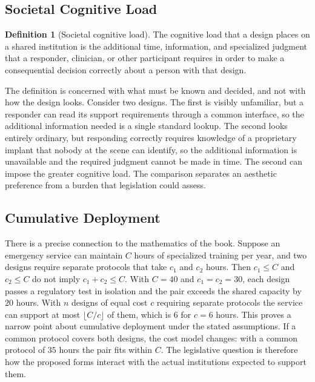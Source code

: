 \documentclass[11pt,openany]{book}
\theoremstyle{definition}
\newtheorem{definition}{Definition}[chapter]
\theoremstyle{remark}
\begin{document}
\subsection*{Societal Cognitive Load}

\begin{definition}[Societal cognitive load]
\label{def:load}
The cognitive load that a design places on a shared institution is the additional time, information, and specialized judgment that a responder, clinician, or other participant requires in order to make a consequential decision correctly about a person with that design.
\end{definition}

The definition is concerned with what must be known and decided, and not with how the design looks. Consider two designs. The first is visibly unfamiliar, but a responder can read its support requirements through a common interface, so the additional information needed is a single standard lookup. The second looks entirely ordinary, but responding correctly requires knowledge of a proprietary implant that nobody at the scene can identify, so the additional information is unavailable and the required judgment cannot be made in time. The second can impose the greater cognitive load. The comparison separates an aesthetic preference from a burden that legislation could assess.

\subsection*{Cumulative Deployment}

There is a precise connection to the mathematics of the book. Suppose an emergency service can maintain $C$ hours of specialized training per year, and two designs require separate protocols that take $c_1$ and $c_2$ hours. Then $c_1\le C$ and $c_2\le C$ do not imply $c_1+c_2\le C$. With $C=40$ and $c_1=c_2=30$, each design passes a regulatory test in isolation and the pair exceeds the shared capacity by $20$ hours. With $n$ designs of equal cost $c$ requiring separate protocols the service can support at most $\lfloor C/c\rfloor$ of them, which is $6$ for $c=6$ hours. This proves a narrow point about cumulative deployment under the stated assumptions. If a common protocol covers both designs, the cost model changes: with a common protocol of $35$ hours the pair fits within $C$. The legislative question is therefore how the proposed forms interact with the actual institutions expected to support them.
\end{document}
